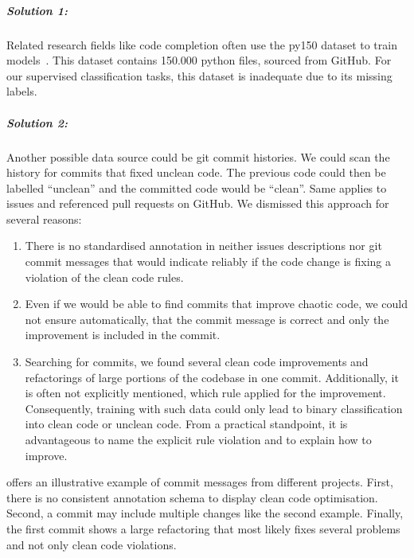 \subparagraph{Solution 1:}
Related research fields like code completion often use the py150 dataset to train models~\cite{raychev2016probabilistic}. This dataset contains 150.000 python files, sourced from GitHub. For our supervised classification tasks, this dataset is inadequate due to its missing labels.  

\subparagraph{Solution 2:}
Another possible data source could be git commit histories. We could scan the history for commits that fixed unclean code. The previous code could then be labelled \enquote{unclean} and the committed code would be \enquote{clean}.
Same applies to issues and referenced pull requests on GitHub.
We dismissed this approach for several reasons:
\begin{enumerate}
    \item There is no standardised annotation in neither issues descriptions nor git commit messages that would indicate reliably if the code change is fixing a violation of the clean code rules.
    \item Even if we would be able to find commits that improve chaotic code, we could not ensure automatically, that the commit message is correct and only the improvement is included in the commit.
    \item Searching for commits, we found several clean code improvements and refactorings of large portions of the codebase in one commit. Additionally, it is often not explicitly mentioned, which rule applied for the improvement. Consequently, training with such data could only lead to binary classification into clean code or unclean code. From a practical standpoint, it is advantageous to name the explicit rule violation and to explain how to improve.
\end{enumerate}
 offers an illustrative example of commit messages from different projects. First, there is no consistent annotation schema to display clean code optimisation. Second, a commit may include multiple changes like the second example. Finally, the first commit shows a large refactoring that most likely fixes several problems and not only clean code violations.

